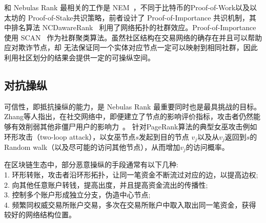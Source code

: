 和 Nebulas Rank 最相关的工作是 NEM~\cite{nem}，不同于比特币的Proof-of-Work以及以太坊的 Proof-of-Stake共识策略，前者设计了 Proof-of-Importance 共识机制，其中排名算法 NCDawareRank ~\cite{Nikolakopoulos2013}利用了网络拓扑的社群效应。Proof-of-Importance 使用 SCAN ~\cite{xu2007scan}\cite{shiokawa2015scan}\cite{chang2017mathsf}作为社群聚类算法。虽然社区结构在交易网络的确存在并且可以帮助应对欺诈节点，却 无法保证同一个实体对应节点一定可以映射到相同社群，因此利用社区划分的结果会提供一定的可操纵空间。


\subsection{对抗操纵}
可信性，即抵抗操纵的能力，是 Nebulas Rank 最重要同时也是最具挑战的目标。Zhang等人指出，在社交网络中，即便建立了节点的影响评价指标，攻击者仍然能够有效削弱其他非僵尸用户的影响力~\cite{zhang2016truetop}。
针对PageRank算法的典型女巫攻击例如环形攻击（two-loop attack），以女巫节点$s$发起到目的节点
$v_j$以及从$v_j$返回到$s$的Random walk（以及尽可能的访问其他节点），从而增加$v_j$的访问概率。


在区块链生态中，部分恶意操纵的手段通常有以下几种:\\
1. 环形转账，攻击者沿环形拓扑，让同一笔资金不断流过对应的边，以提高边权;\\
2. 向其他任意账户转钱，提高出度，并且提高资金流出的传播性;\\
3. 控制多个账户形成独立分支，伪造中心节点;\\
4. 频繁同权威交易所账户交易，多次在交易所账户中取入取出同一笔资金，获得较好的网络结构位置。\\




